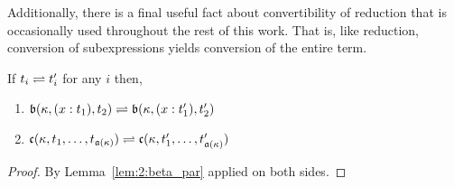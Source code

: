 Additionally, there is a final useful fact about convertibility of reduction that is occasionally used throughout the rest of this work.
That is, like reduction, conversion of subexpressions yields conversion of the entire term.

\begin{lemma}
    If $t_i \rightleftharpoons t_i^\prime$ for any $i$ then,
    \begin{enumerate}
        \item $\mathfrak{b}(\kappa, (x : t_1), t_2) \rightleftharpoons \mathfrak{b}(\kappa, (x : t_1^\prime), t_2^\prime)$
        \item $\mathfrak{c}(\kappa, t_1,\ldots,t_{\mathfrak{a}(\kappa)}) \rightleftharpoons \mathfrak{c}(\kappa, t_1^\prime,\ldots,t_{\mathfrak{a}(\kappa)}^\prime)$
    \end{enumerate}
    \label{lem:2:conv_congr}
\end{lemma}
\begin{proof}
    By Lemma~\ref{lem:2:beta_par} applied on both sides.
\end{proof}

